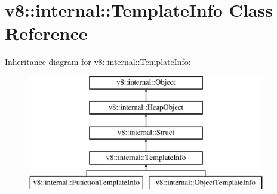 \hypertarget{classv8_1_1internal_1_1_template_info}{}\section{v8\+:\+:internal\+:\+:Template\+Info Class Reference}
\label{classv8_1_1internal_1_1_template_info}
Inheritance diagram for v8\+:\+:internal\+:\+:Template\+Info\+:\begin{figure}[H]
\begin{center}
\leavevmode
\includegraphics[height=5.000000cm]{classv8_1_1internal_1_1_template_info}
\end{center}
\end{figure}
